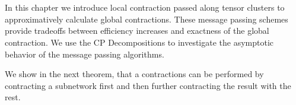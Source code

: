 \chapter{\chatextmessagePassing}\label{cha:messagePassing}

In this chapter we introduce local contraction passed along tensor clusters to approximatively calculate global contractions.
These message passing schemes provide tradeoffs between efficiency increases and exactness of the global contraction.
We use the CP Decompositions to investigate the asymptotic behavior of the message passing algorithms.




We show in the next theorem, that a contractions can be performed by contracting a subnetwork first and then further contracting the result with the rest.

